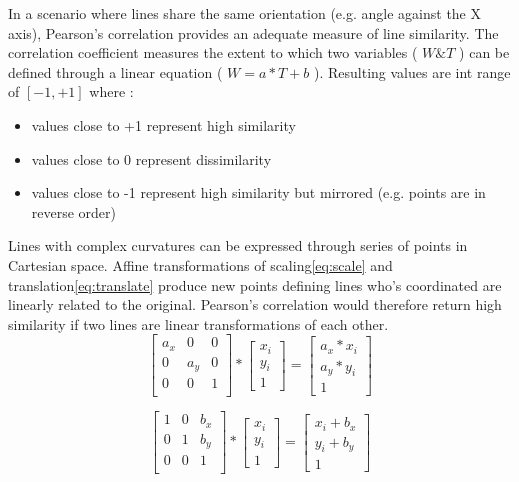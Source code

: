 \documentclass[
    floatsintext
]{article}
\begin{document}
In a scenario where lines share the same orientation (e.g. angle against the X axis), Pearson's correlation provides an adequate measure of line similarity.
The correlation coefficient measures the extent to which two variables ( $W \& T$ ) can be defined through a linear equation ( $W = a * T + b$ ).
Resulting values are int range of $[-1,+1]$ where :
\begin{itemize}
    \item values close to +1 represent high similarity
    \item values close to 0 represent dissimilarity 
    \item values close to -1 represent high similarity but mirrored (e.g. points are in reverse order) 
\end{itemize}

Lines with complex curvatures can be expressed through series of points in Cartesian space. 
Affine transformations of scaling\eqref{eq:scale} and translation\eqref{eq:translate} produce new points defining lines who's coordinated are linearly related to the original.
Pearson's correlation would therefore return high similarity if two lines are linear transformations of each other.    
\begin{equation}
  \begin{bmatrix}
    a_x & 0   & 0   \\
    0   & a_y & 0   \\
    0   & 0   &   1 \\ 
  \end{bmatrix} 
  *
  \begin{bmatrix}
    x_i \\ y_i \\ 1
  \end{bmatrix} 
  = 
  \begin{bmatrix}
    a_x * x_i \\ a_y * y_i \\ 1  
  \end{bmatrix}
  \label{eq:scale}
\end{equation}


\begin{equation}
  \begin{bmatrix}
    1 & 0 & b_x \\
    0 & 1 & b_y \\
    0 & 0 & 1   \\ 
  \end{bmatrix} 
  *
  \begin{bmatrix}
    x_i \\ y_i \\ 1
  \end{bmatrix} 
  = 
  \begin{bmatrix}
    x_i + b_x \\ y_i + b_y \\ 1  
  \end{bmatrix}
  \label{eq:translate}
\end{equation}
\end{document}
